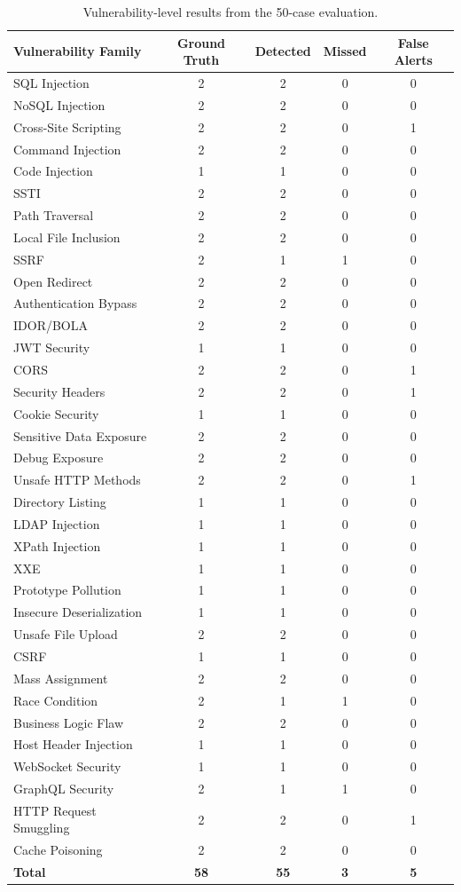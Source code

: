 \documentclass[journal]{IEEEtran}
\begin{document}
\begin{table}[!t]
\centering
\caption{Vulnerability-level results from the 50-case evaluation.}
\label{tab:vulnerability-results}
\scriptsize
\begin{tabularx}{\textwidth}{Xcccc}
\toprule
\textbf{Vulnerability Family} &
\textbf{Ground Truth} &
\textbf{Detected} &
\textbf{Missed} &
\textbf{False Alerts} \\
\midrule
SQL Injection & 2 & 2 & 0 & 0 \\
NoSQL Injection & 2 & 2 & 0 & 0 \\
Cross-Site Scripting & 2 & 2 & 0 & 1 \\
Command Injection & 2 & 2 & 0 & 0 \\
Code Injection & 1 & 1 & 0 & 0 \\
SSTI & 2 & 2 & 0 & 0 \\
Path Traversal & 2 & 2 & 0 & 0 \\
Local File Inclusion & 2 & 2 & 0 & 0 \\
SSRF & 2 & 1 & 1 & 0 \\
Open Redirect & 2 & 2 & 0 & 0 \\
Authentication Bypass & 2 & 2 & 0 & 0 \\
IDOR/BOLA & 2 & 2 & 0 & 0 \\
JWT Security & 1 & 1 & 0 & 0 \\
CORS & 2 & 2 & 0 & 1 \\
Security Headers & 2 & 2 & 0 & 1 \\
Cookie Security & 1 & 1 & 0 & 0 \\
Sensitive Data Exposure & 2 & 2 & 0 & 0 \\
Debug Exposure & 2 & 2 & 0 & 0 \\
Unsafe HTTP Methods & 2 & 2 & 0 & 1 \\
Directory Listing & 1 & 1 & 0 & 0 \\
LDAP Injection & 1 & 1 & 0 & 0 \\
XPath Injection & 1 & 1 & 0 & 0 \\
XXE & 1 & 1 & 0 & 0 \\
Prototype Pollution & 1 & 1 & 0 & 0 \\
Insecure Deserialization & 1 & 1 & 0 & 0 \\
Unsafe File Upload & 2 & 2 & 0 & 0 \\
CSRF & 1 & 1 & 0 & 0 \\
Mass Assignment & 2 & 2 & 0 & 0 \\
Race Condition & 2 & 1 & 1 & 0 \\
Business Logic Flaw & 2 & 2 & 0 & 0 \\
Host Header Injection & 1 & 1 & 0 & 0 \\
WebSocket Security & 1 & 1 & 0 & 0 \\
GraphQL Security & 2 & 1 & 1 & 0 \\
HTTP Request Smuggling & 2 & 2 & 0 & 1 \\
Cache Poisoning & 2 & 2 & 0 & 0 \\
\midrule
\textbf{Total} & \textbf{58} & \textbf{55} & \textbf{3} & \textbf{5} \\
\bottomrule
\end{tabularx}
\end{table}
\end{document}
